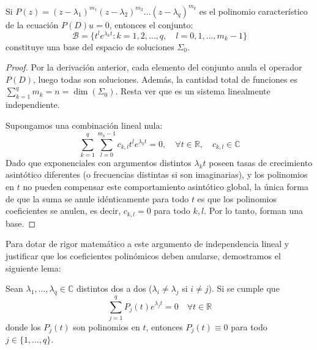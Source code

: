 \begin{teorema}
    Si $P(z) = (z-\lambda_1)^{m_1} (z-\lambda_2)^{m_2} \dots (z-\lambda_q)^{m_q}$ es el polinomio característico de la ecuación $P(D)u = 0$, entonces el conjunto:
    \[
        \mathcal{B} = \{ t^l e^{\lambda_k t} : k = 1, 2, \dots, q, \quad l = 0, 1, \dots, m_k - 1 \}
    \]
    constituye una base del espacio de soluciones $\Sigma_0$.
\end{teorema}

\begin{proof}
    Por la derivación anterior, cada elemento del conjunto anula el operador $P(D)$, luego todas son soluciones. Además, la cantidad total de funciones es $\sum_{k=1}^q m_k = n = \dim(\Sigma_0)$. Resta ver que es un sistema linealmente independiente.
    
    Supongamos una combinación lineal nula:
    \[
        \sum_{k=1}^q \sum_{l=0}^{m_k - 1} c_{k,l} t^l e^{\lambda_k t} = 0, \quad \forall t \in \mathbb{R}, \quad c_{k,l} \in \mathbb{C}
    \]
    Dado que exponenciales con argumentos distintos $\lambda_k t$ poseen tasas de crecimiento asintótico diferentes (o frecuencias distintas si son imaginarias), y los polinomios en $t$ no pueden compensar este comportamiento asintótico global, la única forma de que la suma se anule idénticamente para todo $t$ es que los polinomios coeficientes se anulen, es decir, $c_{k,l} = 0$ para todo $k, l$. Por lo tanto, forman una base.
\end{proof}

Para dotar de rigor matemático a este argumento de independencia lineal y justificar que los coeficientes polinómicos deben anularse, demostramos el siguiente lema:

\begin{lema}
 Sean $\lambda_1, \dots, \lambda_q \in \mathbb{C}$ distintos dos a dos ($\lambda_i \neq \lambda_j$ si $i \neq j$). Si se cumple que
 \[
 \sum_{j=1}^q P_j(t) e^{\lambda_j t} = 0 \quad \forall t \in \mathbb{R}
 \]
 donde los $P_j(t)$ son polinomios en $t$, entonces $P_j(t) \equiv 0$ para todo $j \in \{1, \dots, q\}$.
\end{lema}


